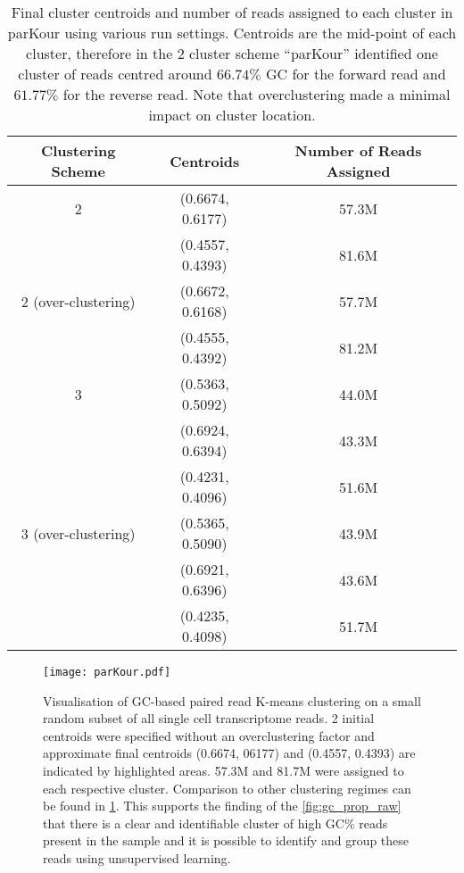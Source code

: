 \begin{table}
    \centering
    \begin{tabular}{|c||c|c|}
        \hline
        \textbf{Clustering Scheme} & \textbf{Centroids} & \textbf{Number of Reads Assigned} \\
        \hline
        2                    & (0.6674, 0.6177) & 57.3M \\
                             & (0.4557, 0.4393) & 81.6M \\
        \hline
        2 (over-clustering)   & (0.6672, 0.6168) & 57.7M \\
                             & (0.4555, 0.4392) & 81.2M \\
        \hline
        3                    & (0.5363, 0.5092) & 44.0M \\
                             & (0.6924, 0.6394) & 43.3M \\
                             & (0.4231, 0.4096) & 51.6M \\
        \hline
        3 (over-clustering)   & (0.5365, 0.5090) & 43.9M \\
                             & (0.6921, 0.6396) & 43.6M \\
                             & (0.4235, 0.4098) & 51.7M \\
        \hline
    \end{tabular} 
    \caption[ParKour Cluster Summaries]{Final cluster centroids and number of reads assigned
    to each cluster in parKour using various run settings.  Centroids
    are the mid-point of each cluster, therefore in the 2 cluster scheme
    ``parKour'' identified one cluster of reads centred around  
    \(66.74\%\) GC for the forward read and \(61.77\%\) for the reverse read.
    Note that 
    overclustering made a minimal impact on cluster location.}
    \label{tab:centroids} 
\end{table} 


\begin{figure}[h!]
	\centering
    \texttt{[image: parKour.pdf]}
    \caption[Plot of parKour clusters]{Visualisation of GC-based paired read K-means clustering on a small random subset of all single cell transcriptome
        reads. 2 initial centroids were specified without an overclustering factor and approximate final centroids (0.6674, 06177) and (0.4557, 0.4393) are indicated by highlighted areas.  57.3M and 81.7M were assigned to each respective cluster. Comparison to other clustering regimes can be found in \cref{tab:centroids}.  This supports the finding of the \cref{fig:gc_prop_raw} that there is a clear and identifiable cluster of high GC\% reads present in the sample and it is possible to identify and group these reads using unsupervised learning. 
} 
        \label{fig:parkour} 
\end{figure}

